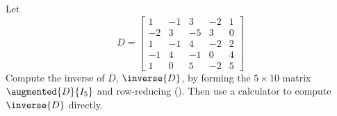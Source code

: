 Let
%
\begin{equation*}
D=\begin{bmatrix}
1 & -1 & 3 & -2 & 1\\
-2 & 3 & -5 & 3 & 0\\
1 & -1 & 4 & -2 & 2\\
-1 & 4 & -1 & 0 & 4\\
1 & 0 & 5 & -2 & 5
\end{bmatrix}
\end{equation*}
%
Compute the inverse of $D$, $\inverse{D}$, by forming the $5\times 10$ matrix $\augmented{D}{I_5}$ and row-reducing ().  Then use a calculator to compute $\inverse{D}$ directly.
